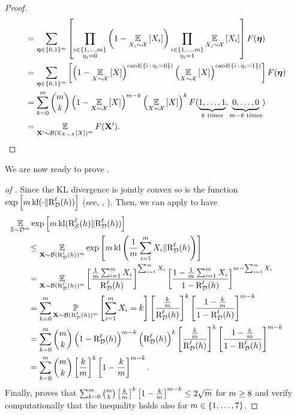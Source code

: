 \begin{noaddcontents}
\begin{proof}
\begin{align*}
    &= \sum_{\boldsymbol{\eta} \in \{0,1\}^m} \left[ \prod_{\substack{i\in\{1,\dots,m\}\\ \eta_i=0}}\left(1-\operatorname*{\mathbb{E}}_{X_i\sim\mathcal{X}}\left[ X_i\right]\right)\prod_{\substack{i\in\{1,\dots,m\}\\ \eta_i=1}}\operatorname*{\mathbb{E}}_{X_i\sim\mathcal{X}}\left[ X_i\right]\right] F(\boldsymbol{\eta})\\
    &= \sum_{\boldsymbol{\eta} \in \{0,1\}^m} \left[ \left(1-\operatorname*{\mathbb{E}}_{X\sim\mathcal{X}}\left[ X\right]\right)^{\operatorname{card}(\{i \,:\, \eta_i=0\})}\left(\operatorname*{\mathbb{E}}_{X\sim\mathcal{X}}\left[ X\right]\right)^{\operatorname{card}(\{i \,:\, \eta_i=1\})}\right] F(\boldsymbol{\eta})\\
    &= \sum_{k=0}^{m}\binom{m}{k}\left(1-\operatorname*{\mathbb{E}}_{X\sim\mathcal{X}}\left[ X\right]\right)^{m-k}\left(\operatorname*{\mathbb{E}}_{X\sim\mathcal{X}}\left[ X\right]\right)^{k}F(\underbrace{1, \dots, 1}_{k\text{ times}}, \underbrace{0, \dots, 0}_{m-k\text{ times}})\\
    &= \operatorname*{\mathbb{E}}_{\mathbf{X}'\sim\mathcal{B}(\operatorname*{\mathbb{E}}_{X\sim\mathcal{X}}[X])^m} F(\mathbf{X}').
\end{align*}
\endgroup
\end{proof}

We are now ready to prove .

\begin{proof}[of ]
Since the KL divergence is jointly convex so is the function $\exp\left[m\operatorname{kl}(\cdot\|\text{R}^{\ell}_{\mathcal{D}}(h))\right]$ (see, \eg, \citet[Section~3.2.4]{BoydVandenberghe2014}).
Then, we can apply  to have
\begin{align*}
    &\hspace{-0.8cm}\EE_{\S\sim\D^\m}\exp\LB\m\kl(\RiskLoss_{\dS}(\h)\|\RiskLoss_{\D}(\h))\RB\\
    &\le \EE_{\Xbf\sim\Bernoulli(\RiskLoss_{\D}(\h))^\m}\exp\LB\m\kl\LP\frac{1}{\m}\sum_{i=1}^{\m}X_i\|\RiskLoss_{\D}(\h)\RP\RB\\
    &= \EE_{\Xbf\sim\Bernoulli(\RiskLoss_{\D}(\h))^\m}\LB\frac{\frac{1}{\m}\sum_{i=1}^{\m}X_i}{\RiskLoss_{\D}(\h)}\RB^{\sum_{i=1}^{\m}X_i}\LB\frac{1-\frac{1}{\m}\sum_{i=1}^{\m}X_i}{1-\RiskLoss_{\D}(\h)}\RB^{\m-\sum_{i=1}^{\m}X_i}\\
    &= \sum_{k=0}^{\m}\PP_{\Xbf\sim\Bernoulli(\RiskLoss_{\D}(\h))^\m}\LB \sum_{i=1}^{\m}X_i=k\RB\LB\frac{\frac{k}{\m}}{\RiskLoss_{\D}(\h)}\RB^{k}\LB\frac{1-\frac{k}{\m}}{1-\RiskLoss_{\D}(\h)}\RB^{\m-k}\\
    &= \sum_{k=0}^{\m} \binom{\m}{k}\LP1-\RiskLoss_{\D}(\h)\RP^{\m-k}\LP\RiskLoss_{\D}(\h)\RP^{k}\LB\frac{\frac{k}{\m}}{\RiskLoss_{\D}(\h)}\RB^{k}\LB\frac{1-\frac{k}{\m}}{1-\RiskLoss_{\D}(\h)}\RB^{\m-k}\\
    &= \sum_{k=0}^{\m}\binom{\m}{k}\LB\frac{k}{\m}\RB^{k}\LB1-\frac{k}{\m}\RB^{\m-k}.
\end{align*}
Finally, \citet{Maurer2004} proves that $\sum_{k=0}^{m}\binom{m}{k}\left[\frac{k}{m}\right]^{k}\left[1-\frac{k}{m}\right]^{m-k}\le 2\sqrt{m}$ for $m\ge8$ and \citet{GermainLacasseLavioletteMarchandRoy2015} verify computationally that the inequality holds also for $m\in\{1,\dots, 7\}$.
\end{proof}


\end{noaddcontents}
